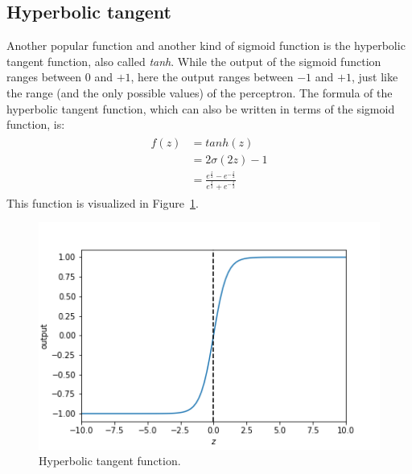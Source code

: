 \subsection{Hyperbolic tangent} %
\label{ssub:hyperbolic_tangent}
Another popular function and another kind of sigmoid function is the hyperbolic tangent function, also called \textit{tanh}. While the output of the sigmoid function ranges between $0$ and $+1$, here the output ranges between $-1$ and $+1$, just like the range (and the only possible values) of the perceptron.
The formula of the hyperbolic tangent function, which can also be written in terms of the sigmoid function, is:
\begin{align}
    \begin{split}
        f(z) &= tanh(z)\\
        &= 2\sigma(2z) - 1\\
        &= \frac{e^{\frac{z}{2}} - e^{-\frac{z}{2}}}{e^{\frac{z}{2}} + e^{-\frac{z}{2}}}
    \end{split}
\end{align}
This function is visualized in Figure~\ref{fig:tanh}.
\begin{figure}[htb]
    \centering
    \includegraphics[width=.8\linewidth]{images/activation_functions/tanh.png}
    \caption{Hyperbolic tangent function.}
    \label{fig:tanh}
\end{figure}

